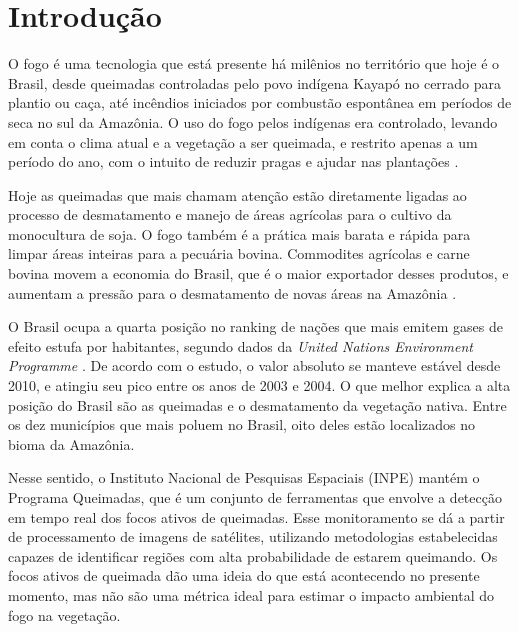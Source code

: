 \documentclass[cic,tc]{iiufrgs}
\begin{document}


\chapter{Introdução}


O fogo é uma tecnologia que está presente há milênios no território que hoje é o Brasil, desde queimadas controladas pelo povo indígena Kayapó no cerrado para plantio ou caça, até incêndios iniciados por combustão espontânea em períodos de seca no sul da Amazônia. O uso do fogo pelos indígenas era controlado, levando em conta o clima atual e a vegetação a ser queimada, e restrito apenas a um período do ano, com o intuito de reduzir pragas e ajudar nas plantações \citep{leonel2000}.

Hoje as queimadas que mais chamam atenção estão diretamente ligadas ao processo de desmatamento e manejo de áreas agrícolas para o cultivo da monocultura de soja. O fogo também é a prática mais barata e rápida para limpar áreas inteiras para a pecuária bovina. Commodites agrícolas e carne bovina movem a economia do Brasil, que é o maior exportador desses produtos, e aumentam a pressão para o desmatamento de novas áreas na Amazônia \citep{fuchs2020}.

O Brasil ocupa a quarta posição no ranking de nações que mais emitem gases de efeito estufa por habitantes, segundo dados da \textit{United Nations Environment Programme} \citet{unep2022}. De acordo com o estudo, o valor absoluto se manteve estável desde 2010, e atingiu seu pico entre os anos de 2003 e 2004. O que melhor explica a alta posição do Brasil são as queimadas e o desmatamento da vegetação nativa. Entre os dez municípios que mais poluem no Brasil, oito deles estão localizados no bioma da Amazônia.

Nesse sentido, o Instituto Nacional de Pesquisas Espaciais (INPE) mantém o Programa Queimadas, que é um conjunto de ferramentas que envolve a detecção em tempo real dos focos ativos de queimadas. Esse monitoramento se dá a partir de processamento de imagens de satélites, utilizando metodologias estabelecidas capazes de identificar regiões com alta probabilidade de estarem queimando. Os focos ativos de queimada dão uma ideia do que está acontecendo no presente momento, mas não são uma métrica ideal para estimar o impacto ambiental do fogo na vegetação.
\end{document}
